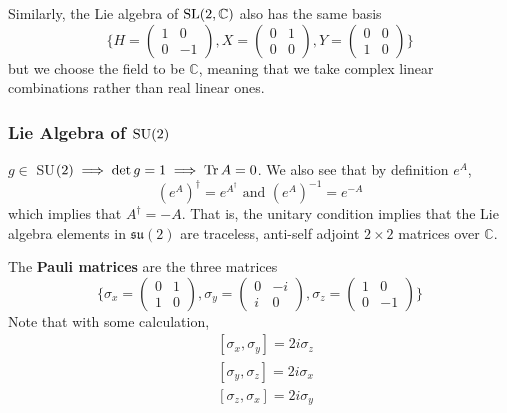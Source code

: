   Similarly, the Lie algebra of $\operatorname{SL}(2, \mathbb{C})$ also has the same basis 
  \begin{equation}
    \bigg\{ H = \begin{pmatrix}
    1&0\\0&-1
    \end{pmatrix}, X = \begin{pmatrix}
    0&1\\0&0
    \end{pmatrix}, Y = \begin{pmatrix}
    0&0\\1&0
    \end{pmatrix}\bigg\}
  \end{equation}
  but we choose the field to be $\mathbb{C}$, meaning that we take complex linear combinations rather than real linear ones. 

\subsubsection[Lie Algebra of SU(2)]{Lie Algebra of \(\operatorname{SU}(2)\)}

  $g \in $ SU$(2) \implies \det{g} = 1 \implies \operatorname{Tr}{A} = 0$. We also see that by definition $e^A$, 
  \begin{equation}
    (e^A)^\dagger = e^{A^\dagger} \text{ and } (e^A)^{-1} = e^{-A}
  \end{equation}
  which implies that $A^\dagger = - A$. That is, the unitary condition implies that the Lie algebra elements in $\mathfrak{su}(2)$ are traceless, anti-self adjoint $2 \times 2$ matrices over $\mathbb{C}$. 

  \begin{definition}
    The \textbf{Pauli matrices} are the three matrices
    \begin{equation}
      \bigg\{ \sigma_x = \begin{pmatrix}
      0&1\\1&0
      \end{pmatrix}, \sigma_y = \begin{pmatrix}
      0&-i\\i&0
      \end{pmatrix}, \sigma_z = \begin{pmatrix}
      1&0\\0&-1
      \end{pmatrix}\bigg\}
    \end{equation}
    Note that with some calculation, 
    \begin{align*}
      & [\sigma_x, \sigma_y] = 2 i \sigma_z \\
      & [\sigma_y, \sigma_z] = 2 i \sigma_x \\
      & [\sigma_z, \sigma_x] = 2 i \sigma_y
    \end{align*}
  \end{definition}


